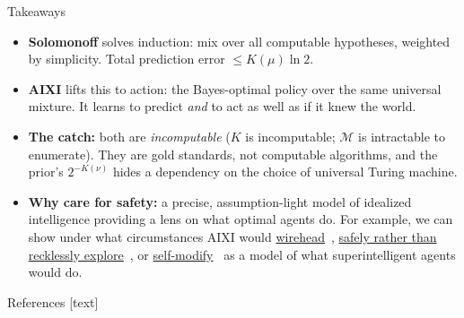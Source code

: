 \documentclass[10pt,aspectratio=169]{beamer}
\newcommand{\citev}[1]{\begingroup\hypersetup{linkcolor=cyan}\cite{#1}\endgroup}
\newcommand{\cM}{\mathcal{M}}
\begin{document}
\begin{frame}{Takeaways}
\begin{itemize}
    \item \textbf{Solomonoff} solves induction: mix over all computable hypotheses, weighted by simplicity.
    Total prediction error $\leq K(\mu)\ln 2$.
    \pause
    \item \textbf{AIXI} lifts this to action: the Bayes-optimal policy over the same universal mixture.
    It learns to predict \emph{and} to act as well as if it knew the world.
    \pause
    \item \textbf{The catch:} both are \emph{incomputable} ($K$ is incomputable; $\cM$ is intractable to enumerate).
    They are gold standards, not computable algorithms, and the prior's $2^{-K(\nu)}$ hides a dependency
    on the choice of universal Turing machine.
    \pause
    \item \textbf{Why care for safety:} a precise, assumption-light model of idealized 
    intelligence providing a lens on what optimal agents do. For example, we
    can show under what circumstances AIXI would \href{https://people.idsia.ch/~ring/AGI-2011/Paper-B.pdf}{wirehead}~\citev{Ring:11delusion},
    \href{https://arxiv.org/pdf/2006.03357}{safely rather than recklessly explore}~\citev{Cohen:20curiosity}, or
    \href{https://link.springer.com/chapter/10.1007/978-3-642-22887-2_1}{self-modify}~\citev{Orseau:11selfmod}
    as a model of what superintelligent agents would do.
\end{itemize}
\end{frame}

\begin{frame}[allowframebreaks]{References}
\footnotesize
{}[text]


\end{frame}
\end{document}
